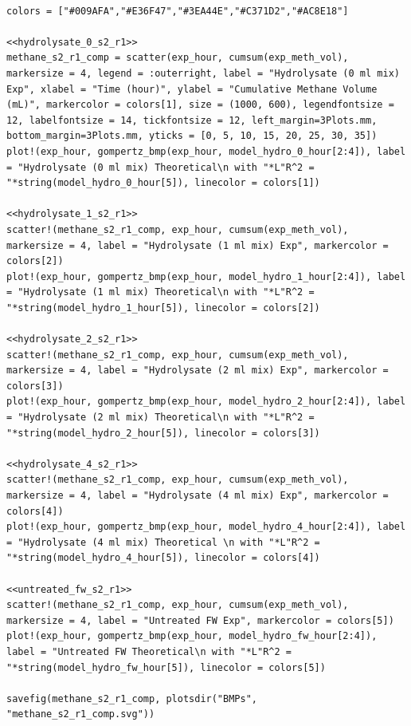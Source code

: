 \documentclass[11pt]{article}
\begin{document}
\begin{verbatim}

colors = ["#009AFA","#E36F47","#3EA44E","#C371D2","#AC8E18"]

<<hydrolysate_0_s2_r1>>
methane_s2_r1_comp = scatter(exp_hour, cumsum(exp_meth_vol), markersize = 4, legend = :outerright, label = "Hydrolysate (0 ml mix) Exp", xlabel = "Time (hour)", ylabel = "Cumulative Methane Volume (mL)", markercolor = colors[1], size = (1000, 600), legendfontsize = 12, labelfontsize = 14, tickfontsize = 12, left_margin=3Plots.mm,  bottom_margin=3Plots.mm, yticks = [0, 5, 10, 15, 20, 25, 30, 35])
plot!(exp_hour, gompertz_bmp(exp_hour, model_hydro_0_hour[2:4]), label = "Hydrolysate (0 ml mix) Theoretical\n with "*L"R^2 = "*string(model_hydro_0_hour[5]), linecolor = colors[1])

<<hydrolysate_1_s2_r1>>
scatter!(methane_s2_r1_comp, exp_hour, cumsum(exp_meth_vol), markersize = 4, label = "Hydrolysate (1 ml mix) Exp", markercolor = colors[2])
plot!(exp_hour, gompertz_bmp(exp_hour, model_hydro_1_hour[2:4]), label = "Hydrolysate (1 ml mix) Theoretical\n with "*L"R^2 = "*string(model_hydro_1_hour[5]), linecolor = colors[2])

<<hydrolysate_2_s2_r1>>
scatter!(methane_s2_r1_comp, exp_hour, cumsum(exp_meth_vol), markersize = 4, label = "Hydrolysate (2 ml mix) Exp", markercolor = colors[3])
plot!(exp_hour, gompertz_bmp(exp_hour, model_hydro_2_hour[2:4]), label = "Hydrolysate (2 ml mix) Theoretical\n with "*L"R^2 = "*string(model_hydro_2_hour[5]), linecolor = colors[3])

<<hydrolysate_4_s2_r1>>
scatter!(methane_s2_r1_comp, exp_hour, cumsum(exp_meth_vol), markersize = 4, label = "Hydrolysate (4 ml mix) Exp", markercolor = colors[4])
plot!(exp_hour, gompertz_bmp(exp_hour, model_hydro_4_hour[2:4]), label = "Hydrolysate (4 ml mix) Theoretical \n with "*L"R^2 = "*string(model_hydro_4_hour[5]), linecolor = colors[4])

<<untreated_fw_s2_r1>>
scatter!(methane_s2_r1_comp, exp_hour, cumsum(exp_meth_vol), markersize = 4, label = "Untreated FW Exp", markercolor = colors[5])
plot!(exp_hour, gompertz_bmp(exp_hour, model_hydro_fw_hour[2:4]), label = "Untreated FW Theoretical\n with "*L"R^2 = "*string(model_hydro_fw_hour[5]), linecolor = colors[5])

savefig(methane_s2_r1_comp, plotsdir("BMPs", "methane_s2_r1_comp.svg"))
\end{verbatim}
\end{document}
